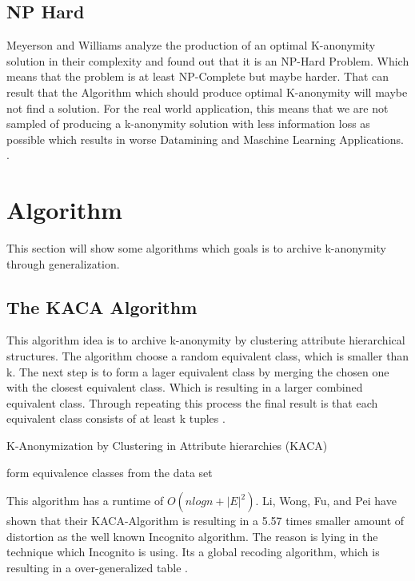 \documentclass{llncs}
\begin{document}
\subsection{NP Hard}
Meyerson and Williams analyze the production of an optimal K-anonymity solution in their complexity and found out that it is an NP-Hard Problem. Which means that the problem is at least NP-Complete but maybe harder. That can result that the Algorithm which should produce optimal K-anonymity will maybe not find a solution. For the real world application, this means that we are not sampled of producing a k-anonymity solution with less information loss as possible which results in worse Datamining and Maschine Learning Applications. . 

\section{Algorithm}
This section will show some algorithms which goals is to archive k-anonymity through generalization. 

\subsection{The KACA Algorithm}
This algorithm idea is to archive k-anonymity by clustering attribute hierarchical structures. The algorithm choose a random equivalent class, which is smaller than k. The next step is to form a lager equivalent class by merging the chosen  one with the closest equivalent class. Which is resulting in a larger combined equivalent class. Through repeating this process the final result is that each equivalent class consists of at least k tuples  \cite{li2006achieving}.\\
\begin{algorithm}[H]
	\caption{K-Anonymization by Clustering in Attribute hierarchies (KACA) \cite{li2006achieving}}
	form equivalence classes from the data set\\
\end{algorithm}
This algorithm has a runtime of $O(nlogn + |E|^{2})$. Li, Wong, Fu, and Pei have shown that their KACA-Algorithm is resulting in a 5.57 times smaller amount of distortion as the well known Incognito algorithm. The reason is lying in the technique which Incognito is using. Its a global recoding algorithm, which is resulting in a over-generalized table \cite{li2006achieving}.
\end{document}
